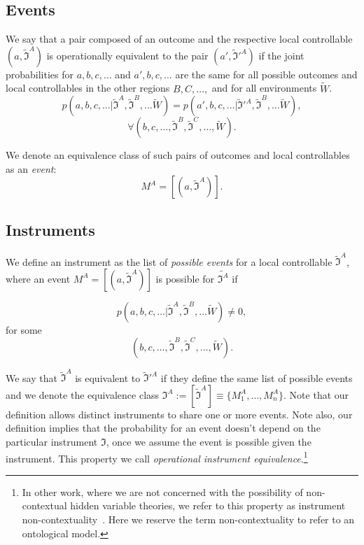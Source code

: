 \documentclass[a4paper,onecolumn,11pt,accepted=2018-05-04]{quantumarticle}
\begin{document}
\subsection{Events}
We say that a pair composed of an outcome and the respective local controllable $(a, \tilde{{\mathfrak{I}}}^A)$ is operationally equivalent to the pair $(a', \tilde{{\mathfrak{I}}}'^A)$ if the joint probabilities for $a, b, c,\dots$ and $a', b, c, \dots$ are the same for all possible outcomes and local controllables in the other regions $B, C,\dots,$ and for all environments $\tilde{W}$.
\begin{equation}
 p(a,b,c,\dots | \tilde{\mathcal{\mathfrak{I}}}^A, \tilde{\mathcal{\mathfrak{I}}}^B,\dots\tilde{W}) = p(a',b,c,\dots | \tilde{\mathcal{\mathfrak{I}}}'^A, \tilde{\mathcal{\mathfrak{I}}}^B,\dots\tilde{W}),
\end{equation}
\begin{equation*}
\forall (b,c,\dots,\tilde{\mathcal{\mathfrak{I}}}^B, \tilde{\mathcal{\mathfrak{I}}}^C,\dots, \tilde{W}).
\end{equation*}

We denote an equivalence class of such pairs of outcomes and local controllables as an \emph{event}:
\begin{equation}\label{events}
M^A = [(a, \tilde{\mathcal{\mathfrak{I}}}^A)].
\end{equation}

\subsection{Instruments}

We define an instrument as the list of \emph{possible events} for a local controllable $ \tilde{\mathcal{\mathfrak{I}}}^A $, where an event $M^A = [(a, \tilde{\mathcal{\mathfrak{I}}}^A)]$ is possible for $\tilde{\mathcal{\mathfrak{I}}^A}$ if

\begin{equation}
 p(a,b,c,\dots | \tilde{\mathcal{\mathfrak{I}}}^A, \tilde{\mathcal{\mathfrak{I}}}^B,\dots\tilde{W}) \neq 0,
\end{equation}
 for some
\begin{equation*}
 (b,c,\dots,\tilde{\mathcal{\mathfrak{I}}}^B, \tilde{\mathcal{\mathfrak{I}}}^C,\dots, \tilde{W}).
\end{equation*}

We say that $\tilde{\mathcal{\mathfrak{I}}}^A$ is equivalent to $\tilde{\mathcal{\mathfrak{I}}}'^A$ if they define the same list of possible events and we denote the equivalence class ${\mathcal{\mathfrak{I}}}^A := [\tilde{\mathcal{\mathfrak{I}}}^A] \equiv \{M_1^A, \dots, M_n^A\}$.
Note that our definition allows distinct instruments to share one or more events. Note also, our definition implies that the probability for an event doesn't depend on the particular instrument $\mathcal{\mathfrak{I}}$, once we assume the event is possible given the instrument. This property we call \emph{operational instrument equivalence}.\footnote{In other work, where we are not concerned with the possibility of non-contextual hidden variable theories, we refer to this property as instrument non-contextuality~\cite{shrapnel2017}. Here we reserve the term non-contextuality to refer to an ontological model.}
\end{document}
